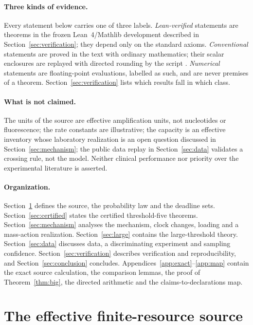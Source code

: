 \documentclass[11pt,a4paper]{article}
\theoremstyle{plain}
\theoremstyle{definition}
\theoremstyle{remark}
\begin{document}
\paragraph{Three kinds of evidence.} Every statement below carries one of three labels. \emph{Lean-verified} statements are theorems in the frozen Lean~4/Mathlib development described in Section~\ref{sec:verification}; they depend only on the standard axioms. \emph{Conventional} statements are proved in the text with ordinary mathematics; their scalar enclosures are replayed with directed rounding by the script . \emph{Numerical} statements are floating-point evaluations, labelled as such, and are never premises of a theorem. Section~\ref{sec:verification} lists which results fall in which class.

\paragraph{What is not claimed.} The units of the source are effective amplification units, not nucleotides or fluorescence; the rate constants are illustrative; the capacity is an effective inventory whose laboratory realization is an open question discussed in Section~\ref{sec:mechanism}; the public data replay in Section~\ref{sec:data} validates a crossing rule, not the model. Neither clinical performance nor priority over the experimental literature is asserted.

\paragraph{Organization.} Section~\ref{sec:model} defines the source, the probability law and the deadline sets. Section~\ref{sec:certified} states the certified threshold-five theorems. Section~\ref{sec:mechanism} analyses the mechanism, clock changes, loading and a mass-action realization. Section~\ref{sec:large} contains the large-threshold theory. Section~\ref{sec:data} discusses data, a discriminating experiment and sampling confidence. Section~\ref{sec:verification} describes verification and reproducibility, and Section~\ref{sec:conclusion} concludes. Appendices~\ref{app:exact}--\ref{app:map} contain the exact source calculation, the comparison lemmas, the proof of Theorem~\ref{thm:big}, the directed arithmetic and the claims-to-declarations map.

\section{The effective finite-resource source}\label{sec:model}
\end{document}
